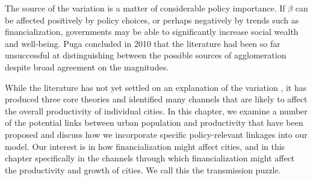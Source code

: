 The source of the variation is a matter of considerable policy importance. If $\beta$ can be affected positively by policy choices, or perhaps negatively by trends such as financialization,  governments may be able to significantly increase social wealth and well-being.  Puga \cite{pugaMagnitudeCausesAgglomeration2010} concluded in 2010 that the literature had been so far unsuccessful at distinguishing between the possible sources of agglomeration despite broad agreement on the magnitudes.  










While the literature has not yet settled on an explanation of the variation \cite{loboUrbanScalingProduction2013}, it has produced three core theories and identified many channels that are likely to affect the overall productivity of individual cities. %
In this chapter, we examine a number of the potential links between urban population and productivity that have been proposed and discuss how we incorporate specific policy-relevant linkages into our model. Our interest is in how financialization might affect cities, and in this chapter specifically in the channels through which financialization might affect the productivity and growth of cities. We call this \gls{the transmission puzzle}.



